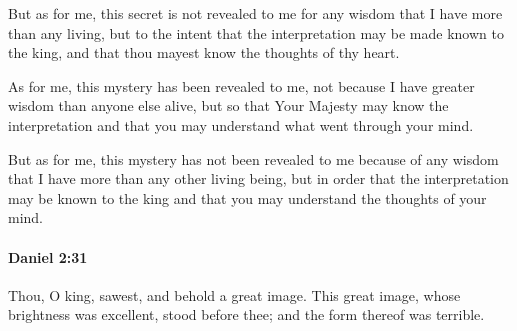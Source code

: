 			\begin{versebox}
					\item[BHS] 
					\item[LXX] 
					\item[ASV] But as for me, this secret is not revealed to me for any wisdom that I have more than any living, but to the intent that the interpretation may be made known to the king, and that thou mayest know the thoughts of thy heart.
					\item[NIV] As for me, this mystery has been revealed to me, not because I have greater wisdom than anyone else alive, but so that Your Majesty may know the interpretation and that you may understand what went through your mind.
					\item[NRSV] But as for me, this mystery has not been revealed to me because of any wisdom that I have more than any other living being, but in order that the interpretation may be known to the king and that you may understand the thoughts of your mind.
			\end{versebox}

		\paragraph{Daniel 2:31} %
			\label{DANIEL-2-31}

			Thou, O king, sawest, and behold a great image. This great image, whose brightness was excellent, stood before thee; and the form thereof was terrible.

